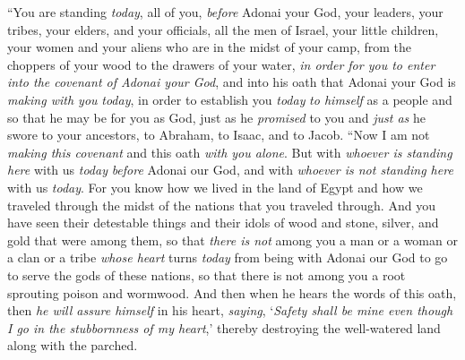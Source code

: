 \begin{biblechapter}
\verse “You are standing \textit{today}, all of you, \textit{before} Adonai your God, your leaders, your tribes, your elders, and your officials, all the men of Israel,
\verse your little children, your women and your aliens who are in the midst of your camp, from the choppers of your wood to the drawers of your water,
\verse \textit{in order for you to enter into the covenant of Adonai your God}, and into his oath that Adonai your God is \textit{making with you} \textit{today},
\verse in order to establish you \textit{today} \textit{to himself} as a people and so that he may be for you as God, just as he \textit{promised} to you and \textit{just as} he swore to your ancestors, to Abraham, to Isaac, and to Jacob.
\verse “Now I am not \textit{making this covenant} and this oath \textit{with you alone}.
\verse But with \textit{whoever is standing here} with us \textit{today} \textit{before} Adonai our God, and with \textit{whoever is not standing here} with us \textit{today}.
\verse For you know how we lived in the land of Egypt and how we traveled through the midst of the nations that you traveled through.
\verse And you have seen their detestable things and their idols of wood and stone, silver, and gold that were among them,
\verse so that \textit{there is not} among you a man or a woman or a clan or a tribe \textit{whose heart} turns \textit{today} from being with Adonai our God to go to serve the gods of these nations, so that there is not among you a root sprouting poison and wormwood.
\verse And then when he hears the words of this oath, then \textit{he will assure himself} in his heart, \textit{saying}, ‘\textit{Safety shall be mine even though I go in the stubbornness of my heart},’ thereby destroying the well-watered land along with the parched.

\end{biblechapter}
